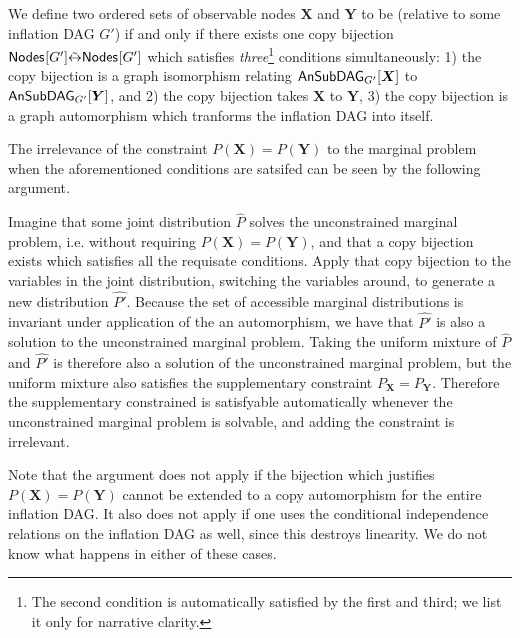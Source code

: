 We define two ordered sets of observable nodes $\bm{X}$ and $\bm{Y}$ to be  (relative to some inflation DAG $G'$) if and only if there exists one copy bijection $\nodes{G'}\subsim{\leftrightarrow}\nodes{G'}$ which satisfies \emph{three}\footnote{The second condition is automatically satisfied by the first and third; we list it only for narrative clarity.} conditions simultaneously: 1) the copy bijection is a graph isomorphism relating $\ansubgraph[G']{\bm{X}}$ to $\ansubgraph[G']{\bm{Y}}$, and 2) the copy bijection takes $\bm{X}$ to $\bm{Y}$, 3) the copy bijection is a graph automorphism which tranforms the inflation DAG into itself.

The irrelevance of the constraint $P(\bm{X}) = P(\bm{Y})$ to the marginal problem when the aforementioned conditions are satsifed can be seen by the following argument.


Imagine that some joint distribution $\hat{P}$ solves the unconstrained marginal problem, i.e. without requiring $P(\bm{X}) = P(\bm{Y})$, and that a copy bijection exists which satisfies all the requisate conditions. Apply that copy bijection to the variables in the joint distribution, switching the variables around, to generate a new distribution $\hat{P'}$. Because the set of accessible marginal distributions is invariant under application of the an automorphism, we have that $\hat{P'}$ is also a solution to the unconstrained marginal problem.  Taking the uniform mixture of $\hat{P}$ and $\hat{P'}$ is therefore also a solution of the unconstrained marginal problem, but the uniform mixture also satisfies the supplementary constraint $P_{\bm{X}} = P_{\bm{Y}}$. Therefore the supplementary constrained is satisfyable automatically whenever the unconstrained marginal problem is solvable, and adding the constraint is irrelevant.


Note that the argument does not apply if the bijection which justifies $P(\bm{X}) = P(\bm{Y})$ cannot be extended to a copy automorphism for the entire inflation DAG. It also does not apply if one uses the conditional independence relations on the inflation DAG as well, since this destroys linearity. We do not know what happens in either of these cases.


